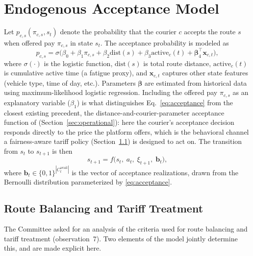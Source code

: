\documentclass[12pt,a4paper]{report}
\begin{document}
\section{Endogenous Acceptance Model}
\label{sec:acceptance}

Let $p_{c,s}(\pi_{c,s}, s_t)$ denote the probability that the courier $c$ accepts the route $s$ when offered pay $\pi_{c,s}$ in state $s_t$. The acceptance probability is modeled as
\begin{equation}
    p_{c,s} = \sigma\!\bigl(\beta_0 + \beta_1 \pi_{c,s} + \beta_2 \text{dist}(s) +
    \beta_3 \text{active}_c(t) + \boldsymbol{\beta}_4^\top \mathbf{x}_{c,t}\bigr),
    \label{eq:acceptance}
\end{equation}
where $\sigma(\cdot)$ is the logistic function, $\text{dist}(s)$ is total route distance, $\text{active}_c(t)$ is cumulative active time (a fatigue proxy), and $\mathbf{x}_{c,t}$ captures other state features (vehicle type, time of day, etc.). Parameters $\boldsymbol{\beta}$ are estimated from historical data using maximum-likelihood logistic
regression. Including the offered pay $\pi_{c,s}$ as an explanatory variable ($\beta_1$) is what distinguishes Eq.~\eqref{eq:acceptance} from the closest existing precedent, the distance-and-courier-parameter acceptance function of \citet{quintero2020computational} (Section~\ref{sec:operational}): here the courier's acceptance decision responds directly to the price the platform offers, which is the behavioral channel a fairness-aware tariff policy (Section~\ref{sec:routebalance}) is designed to act on. The transition from $s_t$ to $s_{t+1}$ is then
\begin{equation}
    s_{t+1} = f\!\bigl(s_t,\; a_t,\; \xi_{t+1},\; \mathbf{b}_t\bigr),
\end{equation}
where $\mathbf{b}_t \in \{0,1\}^{|C_t^{\text{avail}}|}$ is the vector of acceptance realizations, drawn from the Bernoulli distribution parameterized by \eqref{eq:acceptance}.

\subsection{Route Balancing and Tariff Treatment}
\label{sec:routebalance}

The Committee asked for an analysis of the criteria used for route balancing and tariff treatment (observation~7). Two elements of the model jointly determine this, and are made explicit here.
\end{document}
